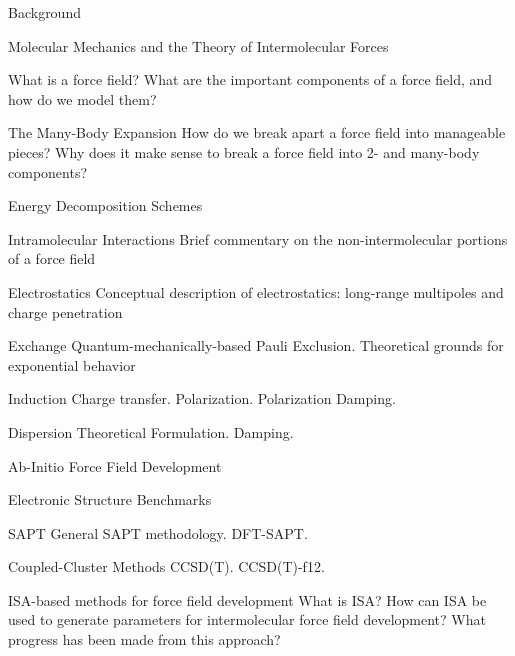 \begin{chapter}{Background}
\label{ch:background}



\begin{section}{Molecular Mechanics and the Theory of Intermolecular Forces}

What is a force field?
What are the important components of a force field, and how do we model them?
%
\begin{subsection}{The Many-Body Expansion}
How do we break apart a force field into manageable pieces? Why does it make
sense to break a force field into 2- and many-body components?
\end{subsection}
\begin{subsection}{Energy Decomposition Schemes}
\begin{subsubsection}{Intramolecular Interactions}
Brief commentary on the non-intermolecular portions of a force field
\end{subsubsection}
\begin{subsubsection}{Electrostatics}
Conceptual description of electrostatics: long-range multipoles and charge
penetration
\end{subsubsection}
\begin{subsubsection}{Exchange}
Quantum-mechanically-based Pauli Exclusion.
Theoretical grounds for exponential behavior
\end{subsubsection}
\begin{subsubsection}{Induction}
Charge transfer.
Polarization.
Polarization Damping.
\end{subsubsection}
\begin{subsubsection}{Dispersion}
Theoretical Formulation.
Damping.
\end{subsubsection}
\end{subsection}
%
\end{section}


\begin{section}{Ab-Initio Force Field Development}
\begin{subsection}{Electronic Structure Benchmarks}
\begin{subsubsection}{SAPT}
General SAPT methodology.
DFT-SAPT.
\end{subsubsection}
\begin{subsubsection}{Coupled-Cluster Methods}
CCSD(T).
CCSD(T)-f12.
\end{subsubsection}
\end{subsection}
\end{section}


\begin{section}{ISA-based methods for force field development}
What is ISA? How can ISA be used to generate parameters for intermolecular
force field development? What progress has been made from this approach?
\end{section}



\end{chapter}

